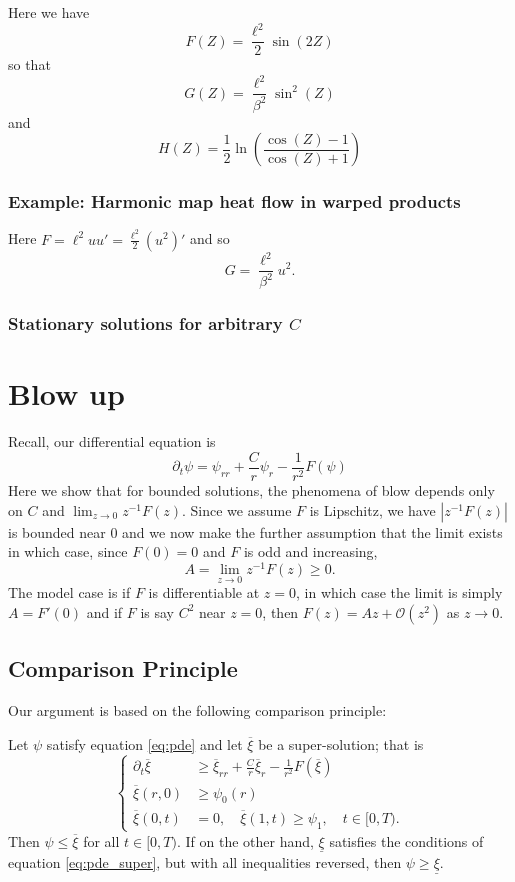 \documentclass{amsart}
\begin{document}
Here we have
\[
F(Z) = \frac{\ell^2}{2} \sin(2Z)
\]
so that
\[
G(Z) = \frac{\ell^2}{\beta^2} \sin^2(Z)
\]
and
\[
H(Z) = \frac{1}{2} \ln \left(\frac{\cos(Z) - 1}{\cos(Z) + 1}\right)
\]

\subsubsection*{Example: Harmonic map heat flow in warped products}

Here \(F = \ell^2 uu' = \tfrac{\ell^2}{2} (u^2)'\) and so
\[
G = \frac{\ell^2}{\beta^2} u^2.
\]
\subsubsection*{Stationary solutions for arbitrary \(C\)}

\section{Blow up}

Recall, our differential equation is
\[
\partial_t \psi = \psi_{rr} + \frac{C}{r} \psi_r - \frac{1}{r^2} F(\psi)
\]
Here we show that for bounded solutions, the phenomena of blow depends only on \(C\) and \(\lim_{z\to 0} z^{-1} F(z)\). Since we assume \(F\) is Lipschitz, we have \(|z^{-1} F(z)|\) is bounded near \(0\) and we now make the further assumption that the limit exists in which case, since \(F(0) = 0\) and \(F\) is odd and increasing,
\[
A = \lim_{z\to 0} z^{-1} F(z) \geq 0.
\]
The model case is if \(F\) is differentiable at \(z=0\), in which case the limit is simply \(A = F'(0)\) and if \(F\) is say \(C^2\) near \(z=0\), then \(F(z) = Az + \mathcal{O} (z^2)\) as \(z \to 0\).

\subsection{Comparison Principle}

Our argument is based on the following comparison principle:

\begin{thm}
Let \(\psi\) satisfy equation \eqref{eq:pde} and let \(\overline{\xi}\) be a super-solution; that is
\begin{equation}
\label{eq:pde_super}
\begin{cases}
\partial_t \overline{\xi} &\geq \overline{\xi}_{rr} + \frac{C}{r} \overline{\xi}_r - \frac{1}{r^2} F(\overline{\xi}) \\
\overline{\xi}(r, 0) &\geq \psi_0(r) \\
\overline{\xi}(0, t) &= 0, \quad \overline{\xi}(1, t) \geq \psi_1, \quad t \in [0, T).
\end{cases}
\end{equation}
Then \(\psi \leq \overline{\xi}\) for all \(t \in [0, T)\). If on the other hand, \(\underline{\xi}\) satisfies the conditions of equation \eqref{eq:pde_super}, but with all inequalities reversed, then \(\psi \geq \underline{\xi}\).
\end{thm}
\end{document}
